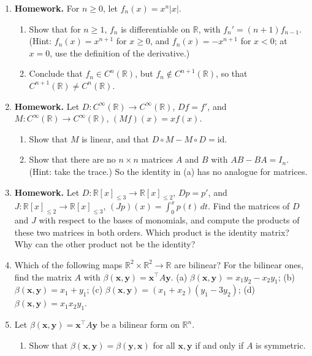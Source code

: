 \documentclass[11pt]{article}
\newcommand{\homework}{\textcolor{red!70!black}{\textbf{Homework.}}}
\theoremstyle{definition}
\theoremstyle{plain}
\theoremstyle{remark}
\begin{document}
\begin{enumerate}[leftmargin=*]
	\item\label{ex:Cn-strict} \homework{} For $n \geq 0$, let $f_n(x) = x^n|x|$.
	\begin{enumerate}
		\item Show that for $n \geq 1$, $f_n$ is differentiable on $\mathbb{R}$, with $f_n' = (n + 1)f_{n-1}$. (Hint: $f_n(x) = x^{n+1}$ for $x \geq 0$, and $f_n(x) = -x^{n+1}$ for $x < 0$; at $x = 0$, use the definition of the derivative.)
		\item Conclude that $f_n \in C^n(\mathbb{R})$, but $f_n \notin C^{n+1}(\mathbb{R})$, so that $C^{n+1}(\mathbb{R}) \neq C^n(\mathbb{R})$.
	\end{enumerate}
	\item \homework{} Let $D: C^\infty(\mathbb{R}) \to C^\infty(\mathbb{R})$, $Df = f'$, and $M: C^\infty(\mathbb{R}) \to C^\infty(\mathbb{R})$, $(Mf)(x) = x f(x)$.
	\begin{enumerate}
		\item Show that $M$ is linear, and that $D \circ M - M \circ D = \mathrm{id}$.
		\item Show that there are no $n \times n$ matrices $A$ and $B$ with $AB - BA = I_n$. (Hint: take the trace.) So the identity in (a) has no analogue for matrices.
	\end{enumerate}
	\item \homework{} Let $D: \mathbb{R}[x]_{\leq 3} \to \mathbb{R}[x]_{\leq 2}$, $Dp = p'$, and $J: \mathbb{R}[x]_{\leq 2} \to \mathbb{R}[x]_{\leq 3}$, $(Jp)(x) = \int_0^x p(t)\, dt$. Find the matrices of $D$ and $J$ with respect to the bases of monomials, and compute the products of these two matrices in both orders. Which product is the identity matrix? Why can the other product not be the identity?
	\item Which of the following maps $\mathbb{R}^2 \times \mathbb{R}^2 \to \mathbb{R}$ are bilinear? For the bilinear ones, find the matrix $A$ with $\beta(\mathbf{x}, \mathbf{y}) = \mathbf{x}^\top A\mathbf{y}$. (a) $\beta(\mathbf{x}, \mathbf{y}) = x_1y_2 - x_2y_1$; (b) $\beta(\mathbf{x}, \mathbf{y}) = x_1 + y_1$; (c) $\beta(\mathbf{x}, \mathbf{y}) = (x_1 + x_2)(y_1 - 3y_2)$; (d) $\beta(\mathbf{x}, \mathbf{y}) = x_1x_2y_1$.
	\item Let $\beta(\mathbf{x}, \mathbf{y}) = \mathbf{x}^\top A\mathbf{y}$ be a bilinear form on $\mathbb{R}^n$.
	\begin{enumerate}
		\item Show that $\beta(\mathbf{x}, \mathbf{y}) = \beta(\mathbf{y}, \mathbf{x})$ for all $\mathbf{x}, \mathbf{y}$ if and only if $A$ is symmetric.

\end{enumerate}
\end{enumerate}
\end{document}
